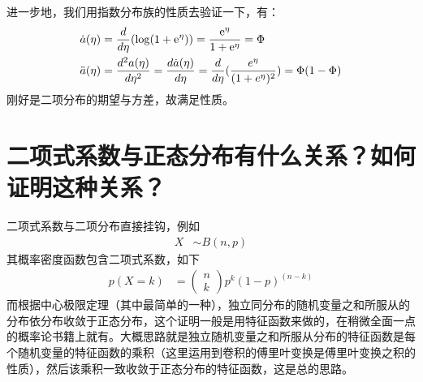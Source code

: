 \documentclass[lang=cn,11pt,a4paper,cite=numbers]{elegantpaper}
\begin{document}
  进一步地，我们用指数分布族的性质去验证一下，有：
\begin{equation}
  \begin{aligned}
    \dot{a}({\eta})&=\frac{d}{d{\eta}}(\rm{log}(1+e^{\eta}))=\frac{e^{\eta}}{1+e^{\eta}}={\Phi}\\
    \ddot{a}({\eta})&=\frac{d^{2}a({\eta})}{d{\eta}^{2}}=\frac{d\dot{a}({\eta})}{d{\eta}}=\frac{d}{d{\eta}}(\frac{e^{\eta}}{(1+e^{\eta})^{2}})={\Phi}(1-{\Phi})
  \end{aligned}
\end{equation}
刚好是二项分布的期望与方差，故满足性质。

\section{二项式系数与正态分布有什么关系？如何证明这种关系？\cite{relationship-binomial-normal}}
二项式系数与二项分布直接挂钩，例如
\begin{equation}
  \begin{aligned}
    X&{\sim}B(n,p)
  \end{aligned}
\end{equation}
其概率密度函数包含二项式系数，如下
\begin{equation}
  \begin{aligned}
    p(X=k)&=\begin{pmatrix}
      n\\
      k
    \end{pmatrix}p^{k}(1-p)^(n-k)
  \end{aligned}
\end{equation}
而根据中心极限定理（其中最简单的一种），独立同分布的随机变量之和所服从的分布依分布收敛于正态分布，这个证明一般是用特征函数来做的，在稍微全面一点的概率论书籍上就有。大概思路就是独立随机变量之和所服从分布的特征函数是每个随机变量的特征函数的乘积（这里运用到卷积的傅里叶变换是傅里叶变换之积的性质），然后该乘积一致收敛于正态分布的特征函数，这是总的思路。

\nocite{*}

\end{document}
